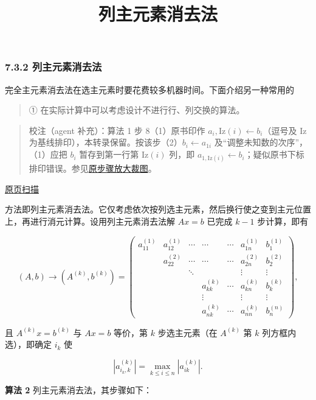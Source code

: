 \documentclass[
  10pt,
  fontset=fandol]{ctexart}
\title{列主元素消去法}
\author{}
\date{}
\begin{document}
\maketitle

\subsubsection{7.3.2 列主元素消去法}\label{ux5217ux4e3bux5143ux7d20ux6d88ux53bbux6cd5}

完全主元素消去法在选主元素时要花费较多机器时间。下面介绍另一种常用的

\begin{quote}
① 在实际计算中可以考虑设计不进行行、列交换的算法。
\end{quote}

\begin{quote}
校注（agent 补充）：算法 1 步 8（1）原书印作 \(a_i,\mathrm{Iz}(i)\leftarrow b_i\)（逗号及 Iz 为基线排印），本转录保留。按该步（2）\(b_i\leftarrow a_{1i}\) 及``调整未知数的次序''，（1）应把 \(b_i\) 暂存到第一行第 \(\mathrm{Iz}(i)\) 列，即 \(a_{1,\mathrm{Iz}(i)}\leftarrow b_i\)；疑似原书下标排印错误。参见\href{../assets/ch07a/pdf-186-step8-detail.png}{原步骤放大裁图}。
\end{quote}

\href{../../source-images/pdf-187.jpeg}{原页扫描}

方法即列主元素消去法。它仅考虑依次按列选主元素，然后换行使之变到主元位置上，再进行消元计算。设用列主元素消去法解 \(Ax=b\) 已完成 \(k-1\) 步计算，即有

\[
(A,b)\to(A^{(k)},b^{(k)})=
\left(\begin{array}{cccccc|c}
a_{11}^{(1)}&a_{12}^{(1)}&\cdots&\cdots&\cdots&a_{1n}^{(1)}&b_1^{(1)}\\
&a_{22}^{(2)}&\cdots&\cdots&\cdots&a_{2n}^{(2)}&b_2^{(2)}\\
&&\ddots&&&\vdots&\vdots\\
&&&a_{kk}^{(k)}&\cdots&a_{kn}^{(k)}&b_k^{(k)}\\
&&&\vdots&&\vdots&\vdots\\
&&&a_{nk}^{(k)}&\cdots&a_{nn}^{(k)}&b_n^{(n)}
\end{array}\right),
\]

且 \(A^{(k)}x=b^{(k)}\) 与 \(Ax=b\) 等价，第 \(k\) 步选主元素（在 \(A^{(k)}\) 第 \(k\) 列方框内选），即确定 \(i_k\) 使

\[|a_{i_k,k}^{(k)}|=\max_{k\le i\le n}|a_{ik}^{(k)}|.\]

\textbf{算法 2} 列主元素消去法，其步骤如下：
\end{document}
